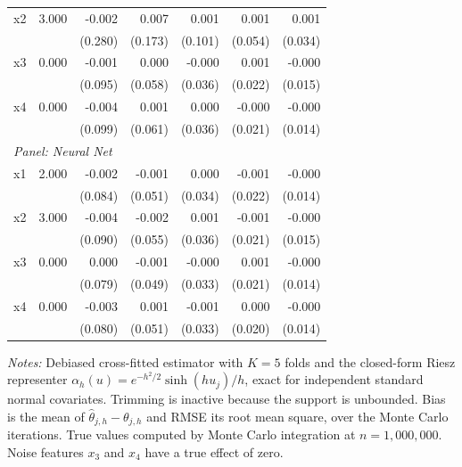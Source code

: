 \begin{table}[htbp]
\begin{threeparttable}
\begin{tabular}{lrrrrrr}
\quad x2 & 3.000 & -0.002 & 0.007 & 0.001 & 0.001 & 0.001 \\
 &  & (0.280) & (0.173) & (0.101) & (0.054) & (0.034) \\
\quad x3 & 0.000 & -0.001 & 0.000 & -0.000 & 0.001 & -0.000 \\
 &  & (0.095) & (0.058) & (0.036) & (0.022) & (0.015) \\
\quad x4 & 0.000 & -0.004 & 0.001 & 0.000 & -0.000 & -0.000 \\
 &  & (0.099) & (0.061) & (0.036) & (0.021) & (0.014) \\
\midrule
\multicolumn{7}{l}{\textit{Panel: Neural Net}} \\
\quad x1 & 2.000 & -0.002 & -0.001 & 0.000 & -0.001 & -0.000 \\
 &  & (0.084) & (0.051) & (0.034) & (0.022) & (0.014) \\
\quad x2 & 3.000 & -0.004 & -0.002 & 0.001 & -0.001 & -0.000 \\
 &  & (0.090) & (0.055) & (0.036) & (0.021) & (0.015) \\
\quad x3 & 0.000 & 0.000 & -0.001 & -0.000 & 0.001 & -0.000 \\
 &  & (0.079) & (0.049) & (0.033) & (0.021) & (0.014) \\
\quad x4 & 0.000 & -0.003 & 0.001 & -0.001 & 0.000 & -0.000 \\
 &  & (0.080) & (0.051) & (0.033) & (0.020) & (0.014) \\
\bottomrule
\end{tabular}
\begin{tablenotes}
\footnotesize
\item \textit{Notes:} Debiased cross-fitted estimator with $K=5$ folds and the closed-form Riesz representer $\alpha_h(u) = e^{-h^2/2}\sinh(h u_j)/h$, exact for independent standard normal covariates. Trimming is inactive because the support is unbounded. Bias is the mean of $\hat{\theta}_{j,h} - \theta_{j,h}$ and RMSE its root mean square, over the Monte Carlo iterations. True values computed by Monte Carlo integration at $n=1{,}000{,}000$. Noise features $x_3$ and $x_4$ have a true effect of zero.
\end{tablenotes}
\end{threeparttable}
\end{table}